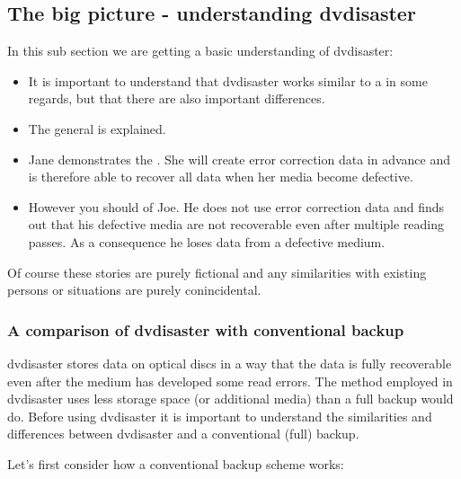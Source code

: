 \subsection{The big picture - understanding dvdisaster}

In this sub section we are getting a basic understanding
of dvdisaster:

\begin{itemize}
\item It is important to understand that dvdisaster works similar
  to a  in some
  regards, but that there are also important differences.
\item The general
   is explained.
\item Jane demonstrates the
  .
  She will create error correction data in advance and is
  therefore able to recover all data when her media become defective.
\item However you should 
  of Joe. He does not use error correction data and finds out that
  his defective media are not recoverable even after multiple
  reading passes. As a consequence he loses data from a defective medium.
\end{itemize}

Of course these stories are purely fictional and any similarities with existing persons or situations are purely conincidental. 

\subsubsection{A comparison of dvdisaster with conventional backup}
\label{bigpicture-backup}

dvdisaster stores data on optical discs in a way that the data
is fully recoverable even after the medium has developed some read errors.
The method employed in dvdisaster uses less storage space (or additional media)
than a full backup would do. Before using dvdisaster it is important to
understand the similarities and differences between dvdisaster and a
conventional (full) backup.

\bigskip

Let's first consider how a conventional backup scheme works:

\bigskip

